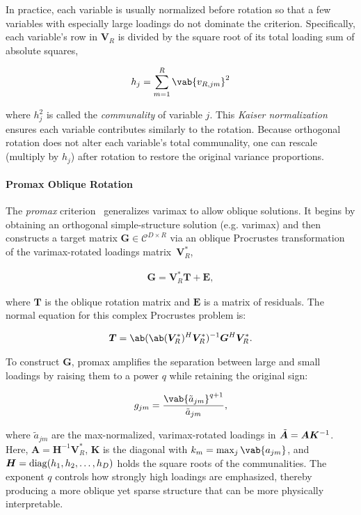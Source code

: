 In practice, each variable is usually normalized before rotation so that a few variables with especially large loadings do not dominate the criterion. Specifically, each variable's row in  $\bm{V}_R$ is divided by the square root of its total loading sum of absolute squares, 

\begin{equation}
    h_j = \sum_{m=1}^{R} \vab{v_{R, jm}}^2
\end{equation}

where $h_j^2$ is called the \emph{communality} of variable $j$. This \emph{Kaiser normalization} ensures each variable contributes similarly to the rotation. Because orthogonal rotation does not alter each variable's total communality, one can rescale (multiply by $h_j$) after rotation to restore the original variance proportions.

\paragraph{Promax Oblique Rotation} The \emph{promax} criterion~\cite{hendrickson_promax_1964} generalizes varimax to allow oblique solutions. It begins by obtaining an orthogonal simple-structure solution (e.g. varimax) and then constructs a target matrix $\bm{G}\in\mathcal{C}^{D \times R}$ via an oblique Procrustes transformation~\cite{hurley_procrustes_1962} of the varimax-rotated loadings matrix~$\bm{V}_R^*$,

\begin{align}\label{eq:theory:procrustes}
    \bm{G} = \bm{V}_R^* \bm{T} + \bm{E},
\end{align}

where $\bm{T}$ is the oblique rotation matrix and $\bm{E}$ is a matrix of residuals. The normal equation for this complex Procrustes problem is:

\begin{align}
    \bm{T} = \ab(\ab(\bm{V}_R^*)^H \bm{V}_R^*)^{-1} \bm{G}^H \bm{V}_R^*.
\end{align}

To construct $\bm{G}$, promax amplifies the separation between large and small loadings by raising them to a power $q$ while retaining the original sign:

\begin{align}
    g_{jm} = \frac{\vab{\tilde{a}_{jm}}^{q+1}}{\tilde{a}_{jm}},
\end{align}

where $\tilde{a}_{jm}$ are the max-normalized, varimax-rotated loadings in $\tilde{\bm{A}} = \bm{A} \bm{K}^{-1}$. Here, $\bm{A} = \bm{H}^{-1}\bm{V}_R^*$, $\bm{K}$ is the diagonal with $k_m = \max_j \vab{a_{jm}}$, and $\bm{H}=\operatorname*{diag}(h_1, h_2, \dots, h_D)$ holds the square roots of the communalities. The exponent $q$ controls how strongly high loadings are emphasized, thereby producing a more oblique yet sparse structure that can be more physically interpretable.

